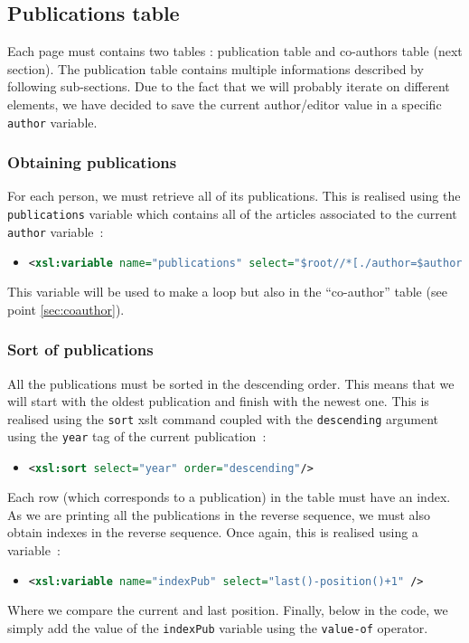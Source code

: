 \documentclass{article}
\begin{document}
  \subsection{Publications table}
  Each page must contains two tables : publication table and co-authors table (next section). The publication table contains multiple informations described by following sub-sections. Due to the fact that we will probably iterate on different elements, we have decided to save the current author/editor value in a specific \verb|author| variable.
    \subsubsection{Obtaining publications}
      For each person, we must retrieve all of its publications. This is realised using the \verb|publications| variable which contains all of the articles associated to the current \verb|author| variable~:
 \begin{itemize}
	\item \begin{lstlisting}[language=XML]
<xsl:variable name="publications" select="$root//*[./author=$author or ./editor=$author]" />\end{lstlisting}
      \end{itemize}
      This variable will be used to make a loop but also in the ``co-author'' table (see point \ref{sec:coauthor}).
      
    \subsubsection{Sort of publications}
      All the publications must be sorted in the descending order. This means that we will start with the oldest publication and finish with the newest one. This is realised using the \verb|sort| xslt command coupled with the \verb|descending| argument using the \verb|year| tag of the current publication~:
      \begin{itemize}
	\item \begin{lstlisting}[language=XML]
<xsl:sort select="year" order="descending"/>\end{lstlisting}
      \end{itemize}
      Each row (which corresponds to a publication) in the table must have an index. As we are printing all the publications in the reverse sequence, we must also obtain indexes in the reverse sequence. Once again, this is realised using a variable~:
      \begin{itemize}
	\item \begin{lstlisting}[language=XML]
<xsl:variable name="indexPub" select="last()-position()+1" />\end{lstlisting}
      \end{itemize}
      Where we compare the current and last position. Finally, below in the code, we simply add the value of the \verb|indexPub| variable using the \verb|value-of| operator. 
      
\end{document}
